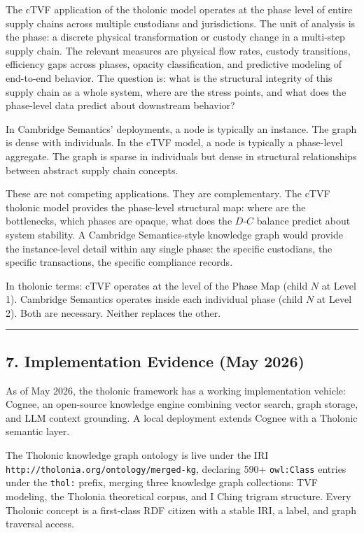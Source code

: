 \documentclass[
  11pt,
  letterpaper,
]{article}
\begin{document}
The cTVF application of the tholonic model operates at the phase level
of entire supply chains across multiple custodians and jurisdictions.
The unit of analysis is the phase: a discrete physical transformation or
custody change in a multi-step supply chain. The relevant measures are
physical flow rates, custody transitions, efficiency gaps across phases,
opacity classification, and predictive modeling of end-to-end behavior.
The question is: what is the structural integrity of this supply chain
as a whole system, where are the stress points, and what does the
phase-level data predict about downstream behavior?

In Cambridge Semantics' deployments, a node is typically an instance.
The graph is dense with individuals. In the cTVF model, a node is
typically a phase-level aggregate. The graph is sparse in individuals
but dense in structural relationships between abstract supply chain
concepts.

These are not competing applications. They are complementary. The cTVF
tholonic model provides the phase-level structural map: where are the
bottlenecks, which phases are opaque, what does the \(D\)-\(C\) balance
predict about system stability. A Cambridge Semantics-style knowledge
graph would provide the instance-level detail within any single phase:
the specific custodians, the specific transactions, the specific
compliance records.

In tholonic terms: cTVF operates at the level of the Phase Map (child
\(N\) at Level 1). Cambridge Semantics operates inside each individual
phase (child \(N\) at Level 2). Both are necessary. Neither replaces the
other.

\begin{center}\rule{0.5\linewidth}{0.5pt}\end{center}

\subsection{7. Implementation Evidence (May
2026)}\label{implementation-evidence-may-2026}

As of May 2026, the tholonic framework has a working implementation
vehicle: Cognee, an open-source knowledge engine combining vector
search, graph storage, and LLM context grounding. A local deployment
extends Cognee with a Tholonic semantic layer.

The Tholonic knowledge graph ontology is live under the IRI
\texttt{http://tholonia.org/ontology/merged-kg}, declaring 590+
\texttt{owl:Class} entries under the \texttt{thol:} prefix, merging
three knowledge graph collections: TVF modeling, the Tholonia
theoretical corpus, and I Ching trigram structure. Every Tholonic
concept is a first-class RDF citizen with a stable IRI, a label, and
graph traversal access.
\end{document}
